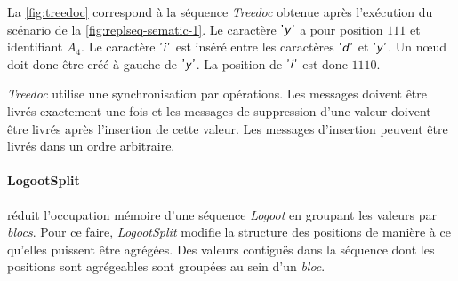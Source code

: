La \autoref{fig:treedoc} correspond à la séquence \emph{Treedoc} obtenue après l'exécution du scénario de la \autoref{fig:replseq-sematic-1}.
Le caractère $\textsf{'\textit{y}'}$ a pour position $111$ et identifiant $A_4$.
Le caractère $\textsf{'\textit{i}'}$ est inséré entre les caractères $\textsf{'\textit{d}'}$ et $\textsf{'\textit{y}'}$.
Un nœud doit donc être créé à gauche de $\textsf{'\textit{y}'}$.
La position de $\textsf{'\textit{i}'}$ est donc $1110$.

\emph{Treedoc} utilise une synchronisation par opérations.
Les messages doivent être livrés exactement une fois et les messages de suppression d'une valeur doivent être livrés après l'insertion de cette valeur.
Les messages d'insertion peuvent être livrés dans un ordre arbitraire.


\paragraph{LogootSplit}\autocite{andre_2013_logootsplit} réduit l'occupation mémoire d'une séquence \emph{Logoot} en groupant les valeurs par \emph{blocs}.
Pour ce faire, \emph{LogootSplit} modifie la structure des positions de manière à ce qu'elles puissent être agrégées.
Des valeurs contiguës dans la séquence dont les positions sont agrégeables sont groupées au sein d'un \emph{bloc}.

